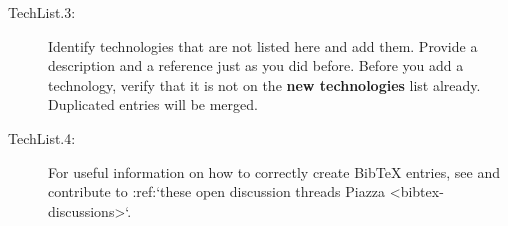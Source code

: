 \begin{description}
\item[TechList.3:]
  Identify technologies that are not listed here and add   them.
  Provide a description and a reference just as you did before. Before you
  add a technology, verify that it is not on the {\bf new technologies} list
  already.  Duplicated entries will be merged.

\item[TechList.4:]
  For useful information on how to correctly create BibTeX entries,
  see and contribute to :ref:`these open discussion threads Piazza
  <bibtex-discussions>`. 

\end{description}
